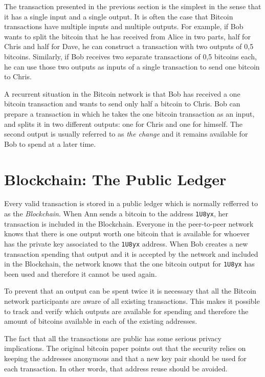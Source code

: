 \documentclass[journal]{IEEEtran}
\begin{document}
The transaction presented in the previous section is the simplest in the sense that it has a single input and a single output.
It is often the case that Bitcoin transactions have multiple inputs and multiple outputs.
For example, if Bob wants to split the bitcoin that he has received from Alice in two parts, half for Chris and half for Dave, he can construct a transaction with two outputs of 0,5 bitcoins.
Similarly, if Bob receives two separate transactions of 0,5 bitcoins each, he can use those two outputs as inputs of a single transaction to send one bitcoin to Chris.

A recurrent situation in the Bitcoin network is that Bob has received a one bitcoin transaction and wants to send only half a bitcoin to Chris.
Bob can prepare a transaction in which he takes the one bitcoin transaction as an input, and splits it in two different outputs: one for Chris and one for himself.
The second output is usually referred to as \emph{the change} and it remains available for Bob to spend at a later time.

\section{Blockchain: The Public Ledger}

Every valid transaction is stored in a public ledger which is normally refferred to as the \emph{ Blockchain}.
When Ann sends a bitcoin to the address \texttt{1U8yx}, her transaction is included in the Blockchain.
Everyone in the peer-to-peer network knows that there is one output worth one bitcoin that is available for whoever has the private key associated to the \texttt{1U8yx} address.
When Bob creates a new transaction spending that output and it is accepted by the network and included in the Blockchain, the network knows that the one bitcoin output for \texttt{1U8yx} has been used and therefore it cannot be used again.

To prevent that an output can be spent twice it is necessary that all the Bitcoin network participants are aware of all existing transactions.
This makes it possible to track and verify which outputs are available for spending and therefore the amount of bitcoins available in each of the existing addresses.

The fact that all the transactions are public has some serious privacy implications.
The original bitcoin paper \cite{nakamoto2008bpp} points out that the security relies on keeping the addresses anonymous and that a new key pair should be used for each transaction.
In other words, that address reuse should be avoided.
\end{document}
